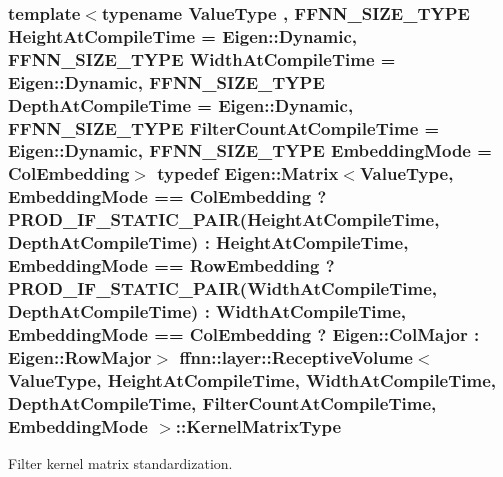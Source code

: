 \hypertarget{classffnn_1_1layer_1_1_receptive_volume_af207f604ba81e52546c400dd85de014f}{
\subsubsection[{Kernel\-Matrix\-Type}]{\setlength{\rightskip}{0pt plus 5cm}template$<$typename Value\-Type , F\-F\-N\-N\-\_\-\-S\-I\-Z\-E\-\_\-\-T\-Y\-P\-E Height\-At\-Compile\-Time = Eigen\-::\-Dynamic, F\-F\-N\-N\-\_\-\-S\-I\-Z\-E\-\_\-\-T\-Y\-P\-E Width\-At\-Compile\-Time = Eigen\-::\-Dynamic, F\-F\-N\-N\-\_\-\-S\-I\-Z\-E\-\_\-\-T\-Y\-P\-E Depth\-At\-Compile\-Time = Eigen\-::\-Dynamic, F\-F\-N\-N\-\_\-\-S\-I\-Z\-E\-\_\-\-T\-Y\-P\-E Filter\-Count\-At\-Compile\-Time = Eigen\-::\-Dynamic, F\-F\-N\-N\-\_\-\-S\-I\-Z\-E\-\_\-\-T\-Y\-P\-E Embedding\-Mode = Col\-Embedding$>$ typedef Eigen\-::\-Matrix$<$Value\-Type, {\bf Embedding\-Mode} == {\bf Col\-Embedding} ? {\bf P\-R\-O\-D\-\_\-\-I\-F\-\_\-\-S\-T\-A\-T\-I\-C\-\_\-\-P\-A\-I\-R}(Height\-At\-Compile\-Time, Depth\-At\-Compile\-Time) \-: Height\-At\-Compile\-Time, {\bf Embedding\-Mode} == {\bf Row\-Embedding} ? {\bf P\-R\-O\-D\-\_\-\-I\-F\-\_\-\-S\-T\-A\-T\-I\-C\-\_\-\-P\-A\-I\-R}(Width\-At\-Compile\-Time, Depth\-At\-Compile\-Time) \-: Width\-At\-Compile\-Time, {\bf Embedding\-Mode} == {\bf Col\-Embedding} ? Eigen\-::\-Col\-Major \-: Eigen\-::\-Row\-Major$>$ {\bf ffnn\-::layer\-::\-Receptive\-Volume}$<$ Value\-Type, Height\-At\-Compile\-Time, Width\-At\-Compile\-Time, Depth\-At\-Compile\-Time, Filter\-Count\-At\-Compile\-Time, {\bf Embedding\-Mode} $>$\-::{\bf Kernel\-Matrix\-Type}}}\label{classffnn_1_1layer_1_1_receptive_volume_af207f604ba81e52546c400dd85de014f}


Filter kernel matrix standardization. 

